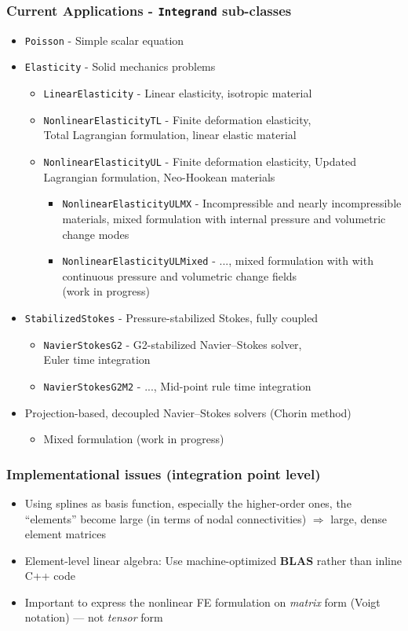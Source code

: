 \documentclass{beamer}
\def\classitem#1{\item{\color{red}\tt#1} -}
\begin{document}
\frame %
{
 \frametitle{Current Applications - {\color{red}\tt Integrand} sub-classes}

 \small
 \begin{itemize}
  \classitem{Poisson} Simple scalar equation

  \pause
  \classitem{Elasticity} Solid mechanics problems
  \begin{itemize}
   \classitem{LinearElasticity} Linear elasticity, isotropic material
   \classitem{NonlinearElasticityTL} Finite deformation elasticity, \\
    Total Lagrangian formulation, linear elastic material
   \classitem{NonlinearElasticityUL} Finite deformation elasticity,
    Updated Lagrangian formulation, Neo-Hookean materials
   \pause
   \begin{itemize}
    \classitem{NonlinearElasticityULMX} Incompressible and nearly incompressible
     materials, mixed formulation with internal pressure and volumetric change
     modes
    \classitem{NonlinearElasticityULMixed} ...,
     mixed formulation with with continuous pressure and volumetric change fields
    \\(work in progress)
   \end{itemize}
  \end{itemize}

  \pause
  \classitem{StabilizedStokes} Pressure-stabilized Stokes, fully coupled
  \begin{itemize}
   \classitem{NavierStokesG2} G2-stabilized Navier--Stokes solver, \\
                              Euler time integration
   \classitem{NavierStokesG2M2} ..., Mid-point rule time integration
  \end{itemize}

  \pause
  \item Projection-based, decoupled Navier--Stokes solvers (Chorin method)
  \begin{itemize}
   \item Mixed formulation (work in progress)
  \end{itemize}

 \end{itemize}
}

\frame %
{
 \frametitle{Implementational issues (integration point level)}

 \begin{itemize}
  \item<1-> Using splines as basis function, especially the higher-order ones,
            the ``elements'' become large (in terms of nodal connectivities)
            $\Rightarrow$ large, dense element matrices
  \item<2-> Element-level linear algebra: Use machine-optimized {\bf BLAS}
            rather than inline C++ code
  \item<2-> Important to express the nonlinear FE formulation on {\em matrix}
            form (Voigt notation) --- not {\em tensor} form
 \end{itemize}
}
\end{document}
